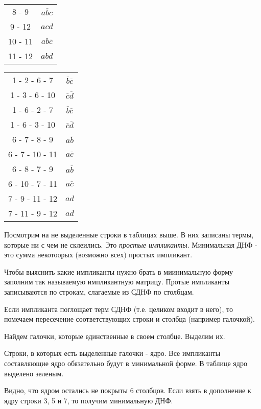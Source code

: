 \documentclass[a4paper,12pt]{article}
\begin{document}
\begin{table}[h!]
\begin{tabular}[t]{| c | c |}
\rowcolor{lightgray}8 - 9 & $a\overline{b}c$ \\
\rowcolor{lightgray}9 - 12 & $acd$ \\
\rowcolor{lightgray}10 - 11 & $ab\overline{c}$ \\
\rowcolor{lightgray}11 - 12 & $abd$ \\
\hline
\end{tabular}
\quad
\begin{tabular}[t]{| c | c |}
\hline
1 - 2 - 6 - 7 & $\overline{b}\overline{c}$ \\
1 - 3 - 6 - 10 & $\overline{c}\overline{d}$ \\
1 - 6 - 2 - 7 & $\overline{b}\overline{c}$ \\
1 - 6 - 3 - 10 & $\overline{c}\overline{d}$ \\
6 - 7 - 8 - 9 & $a\overline{b}$ \\
6 - 7 - 10 - 11 & $a\overline{c}$ \\
6 - 8 - 7 - 9 & $a\overline{b}$ \\
6 - 10 - 7 - 11 & $a\overline{c}$ \\
7 - 9 - 11 - 12 & $ad$ \\
7 - 11 - 9 - 12 & $ad$ \\
\hline
\end{tabular}
\end{table}

Посмотрим на не выделенные строки в таблицах выше.
В них записаны термы, которые ни с чем не склеились.
Это \emph{простые импликанты}.
Минимальная ДНФ - это сумма некотоорых (возможно всех) простых импликант.

Чтобы выяснить какие импликанты нужно брать в миинимальную форму заполним так называемую импликантную матрицу.
Протые импликанты записываются по строкам, слагаемые из СДНФ по столбцам.

Если импликанта поглощает терм СДНФ (т.е. целиком входит в него), то помечаем пересечение соответствующих строки и столбца (например галочкой).

Найдем галочки, которые единственные в своем столбце.
Выделим их.

Строки, в которых есть выделенные галочки - ядро.
Все импликанты составляющие ядро обязательно будут в минимальной форме.
В таблице ядро выделено зеленым.

Видно, что ядром остались не покрыты 6 столбцов.
Если взять в дополнение к ядру строки 3, 5 и 7, то получим минимальную ДНФ.
\end{document}
